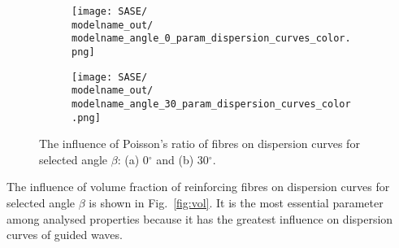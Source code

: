 \documentclass[preprint,12pt]{elsarticle}
\begin{document}
\begin{figure} [h!]
	\centering
	\newcommand{\modelname}{SASE7_plain_weave}
	\begin{subfigure}[b]{0.49\textwidth}
		\centering
		\texttt{[image: SASE/\\modelname\_out/\\modelname\_angle\_0\_param\_dispersion\_curves\_color.png]}
		\caption{}
		\label{fig:nif0}
	\end{subfigure}
	\hfill
	\begin{subfigure}[b]{0.49\textwidth}
		\centering
		\texttt{[image: SASE/\\modelname\_out/\\modelname\_angle\_30\_param\_dispersion\_curves\_color.png]}
		\caption{}
		\label{fig:nif30}
	\end{subfigure}
	\caption{The influence of Poisson's ratio of fibres on dispersion curves for selected angle $\beta$: (a) 0$^{\circ}$ and (b) 30$^{\circ}$.} 
	\label{fig:nif}
\end{figure}

The influence of volume fraction of reinforcing fibres on dispersion curves for selected angle $\beta$ is shown in Fig.~\ref{fig:vol}. It is the most essential parameter among analysed properties because it has the greatest influence on dispersion curves of guided waves.
\end{document}
